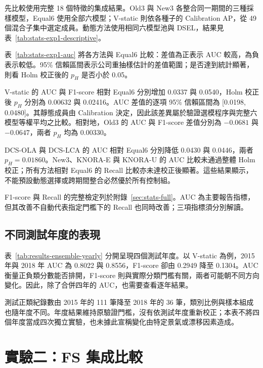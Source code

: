 先比較使用完整 18 個特徵的集成結果。Old3 與 New3 各整合同一期間的三種採樣模型，Equal6 使用全部六模型；V-static 則依各種子的 Calibration AP，從 49 個混合子集中選定成員。動態方法使用相同六模型池與 DSEL，結果見表~\ref{tab:stats-exp1-descriptive}。



表~\ref{tab:stats-exp1-auc} 將各方法與 Equal6 比較：差值為正表示 AUC 較高，為負表示較低。95\% 信賴區間表示公司重抽樣估計的差值範圍；是否達到統計顯著，則看 Holm 校正後的 \(p_H\) 是否小於 0.05。



V-static 的 AUC 與 F1-score 相對 Equal6 分別增加 0.0337 與 0.0540，Holm 校正後 \(p_H\) 分別為 0.00632 與 0.02416。AUC 差值的逐項 95\% 信賴區間為 [0.0198, 0.0480]。其靜態成員由 Calibration 決定，因此該差異屬於驗證選模程序與完整六模型等權平均之比較。相對地，Old3 的 AUC 與 F1-score 差值分別為 \(-0.0681\) 與 \(-0.0647\)，兩者 \(p_H\) 均為 0.00330。

DCS-OLA 與 DCS-LCA 的 AUC 相對 Equal6 分別降低 0.0430 與 0.0446，兩者 \(p_H=0.01860\)。New3、KNORA-E 與 KNORA-U 的 AUC 比較未通過整體 Holm 校正；所有方法相對 Equal6 的 Recall 比較亦未達校正後顯著。這些結果顯示，不能預設動態選擇或跨期間整合必然優於所有控制組。

F1-score 與 Recall 的完整檢定列於附錄~\ref{sec:stats-full}。AUC 為主要報告指標，但其改善不自動代表指定門檻下的 Recall 也同時改善；三項指標須分別解讀。

\subsection{不同測試年度的表現}



表~\ref{tab:results-ensemble-yearly} 分開呈現四個測試年度。以 V-static 為例，2015 年與 2018 年 AUC 為 0.8022 與 0.8556，F1-score 卻由 0.2949 降至 0.1304。AUC 衡量正負類分數能否排開，F1-score 則與實際分類門檻有關，兩者可能朝不同方向變化。因此，除了合併四年的 AUC，也需要查看逐年結果。

測試正類紀錄數由 2015 年的 111 筆降至 2018 年的 36 筆，類別比例與樣本組成也隨年度不同。年度結果維持原驗證門檻，沒有依測試年度重新校正；本表不將四個年度當成四次獨立實驗，也未據此宣稱變化由特定景氣或漂移因素造成。

\section{實驗二：FS 集成比較}\label{sec:results-experiment2}

